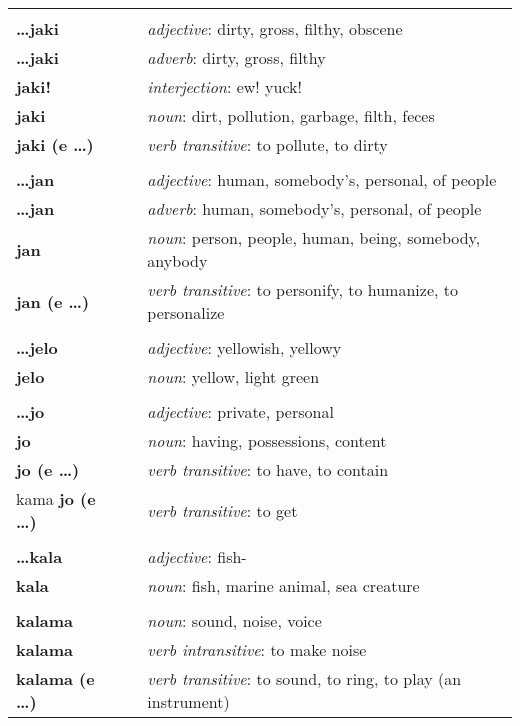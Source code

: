 \begin{supertabular}{p{2,5cm}|ll}
 && \\ %
\textbf{\dots jaki} && \textit{adjective}: dirty, gross, filthy, obscene \\ 
\textbf{\dots jaki} && \textit{adverb}: dirty, gross, filthy \\ 
\textbf{jaki!} && \textit{interjection}: ew! yuck! \\ 
\textbf{jaki} && \textit{noun}: dirt, pollution, garbage, filth, feces \\ 
\textbf{jaki (e \dots)} && \textit{verb transitive}: to pollute, to dirty \\ 
 && \\ %
\textbf{\dots jan} && \textit{adjective}: human, somebody's, personal, of people \\ 
\textbf{\dots jan} && \textit{adverb}: human, somebody's, personal, of people \\ 
\textbf{jan} && \textit{noun}: person, people, human, being, somebody, anybody \\ 
\textbf{jan (e \dots)} && \textit{verb transitive}: to personify, to humanize, to personalize \\ 
 && \\ %
\textbf{\dots jelo} && \textit{adjective}: yellowish, yellowy \\ 
\textbf{jelo} && \textit{noun}: yellow, light green \\ 
 && \\ %
\textbf{\dots jo} && \textit{adjective}: private, personal \\ 
\textbf{jo} && \textit{noun}: having, possessions, content \\ 
\textbf{jo (e \dots)} && \textit{verb transitive}: to have, to contain \\ 
kama \textbf{jo (e \dots)} && \textit{verb transitive}: to get \\ 
 && \\ %
\textbf{\dots kala} && \textit{adjective}: fish- \\ 
\textbf{kala} && \textit{noun}: fish, marine animal, sea creature \\ 
 && \\ %
\textbf{kalama} && \textit{noun}: sound, noise, voice \\ 
\textbf{kalama} && \textit{verb intransitive}: to make noise \\ 
\textbf{kalama (e \dots)} && \textit{verb transitive}: to sound, to ring, to play (an instrument) \\ 

\end{supertabular}
